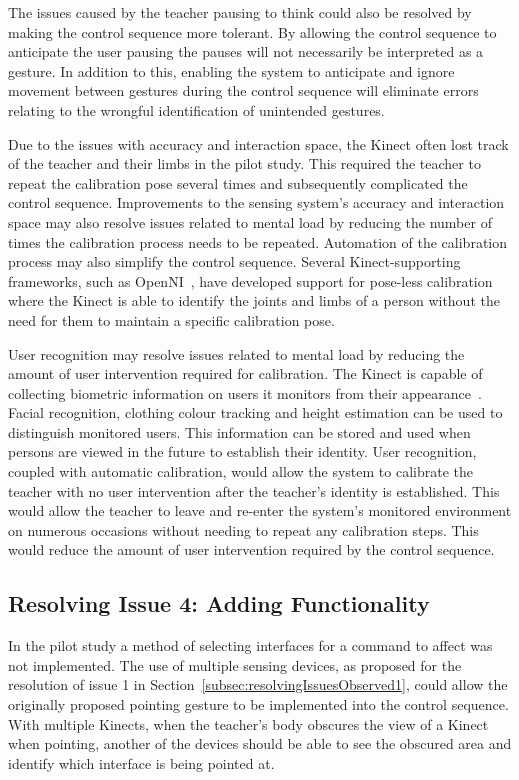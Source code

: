 \documentclass[link]{IWCOMP}
\begin{document}
The issues caused by the teacher pausing to think could also be resolved by making the control sequence more tolerant.
By allowing the control sequence to anticipate the user pausing the pauses will not necessarily be interpreted as a gesture.
In addition to this, enabling the system to anticipate and ignore movement between gestures during the control sequence will eliminate errors relating to the wrongful identification of unintended gestures.

Due to the issues with accuracy and interaction space, the Kinect often lost track of the teacher and their limbs in the pilot study.
This required the teacher to repeat the calibration pose several times and subsequently complicated the control sequence.
Improvements to the sensing system's accuracy and interaction space may also resolve issues related to mental load by reducing the number of times the calibration process needs to be repeated.
Automation of the calibration process may also simplify the control sequence.
Several Kinect-supporting frameworks, such as OpenNI~\cite{Organisation2011}, have developed support for pose-less calibration where the Kinect is able to identify the joints and limbs of a person without the need for them to maintain a specific calibration pose.

User recognition may resolve issues related to mental load by reducing the amount of user intervention required for calibration.
The Kinect is capable of collecting biometric information on users it monitors from their appearance~\cite{Leyvand2011}.
Facial recognition, clothing colour tracking and height estimation can be used to distinguish monitored users.
This information can be stored and used when persons are viewed in the future to establish their identity.
User recognition, coupled with automatic calibration, would allow the system to calibrate the teacher with no user intervention after the teacher's identity is established.
This would allow the teacher to leave and re-enter the system's monitored environment on numerous occasions without needing to repeat any calibration steps.
This would reduce the amount of user intervention required by the control sequence.

\subsection{Resolving Issue 4: Adding Functionality}
\label{subsec:resolvingIssuesObserved4}

In the pilot study a method of selecting interfaces for a command to affect was not implemented.
The use of multiple sensing devices, as proposed for the resolution of issue 1 in Section~\ref{subsec:resolvingIssuesObserved1}, could allow the originally proposed pointing gesture to be implemented into the control sequence.
With multiple Kinects, when the teacher's body obscures the view of a Kinect when pointing, another of the devices should be able to see the obscured area and identify which interface is being pointed at.
\end{document}

